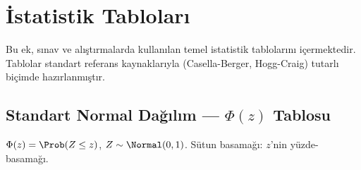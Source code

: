 \chapter{İstatistik Tabloları}
\label{app:istatistik_tablolari}

Bu ek, sınav ve alıştırmalarda kullanılan temel istatistik tablolarını içermektedir. Tablolar standart referans kaynaklarıyla (Casella-Berger, Hogg-Craig) tutarlı biçimde hazırlanmıştır.

\section{Standart Normal Dağılım — $\Phi(z)$ Tablosu}
\label{app:normal_tablo}

$\Phi(z) = \Prob(Z\leq z)$, $Z\sim\Normal(0,1)$. Sütun basamağı: $z$'nin yüzde-basamağı.

